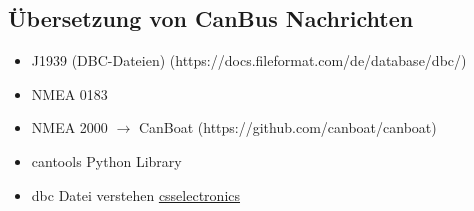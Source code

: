 \subsection{Übersetzung von CanBus Nachrichten}
\begin{itemize}
    \item J1939 (DBC-Dateien) (https://docs.fileformat.com/de/database/dbc/)
    \item NMEA 0183 
    \item NMEA 2000 $\rightarrow$ CanBoat (https://github.com/canboat/canboat)
    \item cantools Python Library 
    \item dbc Datei verstehen \href{https://www.csselectronics.com/pages/can-dbc-file-database-intro}{csselectronics}
\end{itemize}